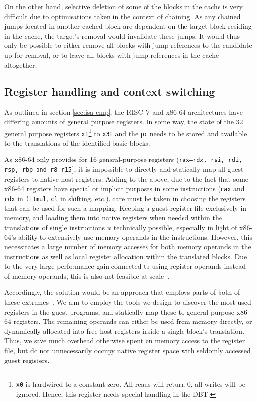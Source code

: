 On the other hand, selective deletion of some of the blocks in the cache is very difficult due to optimisations taken in the context of chaining.
As any chained jumps located in another cached block are dependent on the target block residing in the cache, the target's removal would invalidate these jumps.
It would thus only be possible to either remove all blocks with jump references to the candidate up for removal, or to leave all blocks with jump references in the cache altogether.


\subsection{Register handling and context switching}
\label{sec:context-switch-reg-handle}
As outlined in section \ref{sec:isa-cmp}, the RISC-V and x86-64 architectures have differing amounts of general purpose registers.
In some way, the state of the 32 general purpose registers \texttt{x1}\footnote{\texttt{x0} is hardwired to a constant zero. All reads will return 0, all writes will be ignored. Hence, this register needs special handling in the DBT.} to \texttt{x31} and the \texttt{pc} needs to be stored and available to the translations of the identified basic blocks.

As x86-64 only provides for 16 general-purpose registers (\texttt{rax--rdx, rsi, rdi, rsp, rbp and r8--r15}), it is impossible to directly and statically map all guest registers to native host registers.
Adding to the above, due to the fact that some x86-64 registers have special or implicit purposes in some instructions (\texttt{rax} and \texttt{rdx} in \texttt{(i)mul}, \texttt{cl} in shifting, etc.), care must be taken in choosing the registers that can be used for such a mapping.
Keeping a guest register file exclusively in memory, and loading them into native registers when needed within the translations of single instructions is technically possible, especially in light of x86-64's ability to extensively use memory operands in the instructions.
However, this necessitates a large number of memory accesses for both memory operands in the instructions as well as local register allocation within the translated blocks.
Due to the very large performance gain connected to using register operands instead of memory operands, this is also not feasible at scale~\cite[S. 8f.]{bintrans}.

Accordingly, the solution would be an approach that employs parts of both of these extremes~\cite[S. 9]{bintrans}.
We aim to employ the tools we design to discover the most-used registers in the guest programs, and statically map these to general purpose x86-64 registers.
The remaining operands can either be used from memory directly, or dynamically allocated into free host registers inside a single block's translation.
Thus, we save much overhead otherwise spent on memory access to the register file, but do not unnecessarily occupy native register space with seldomly accessed guest registers.

